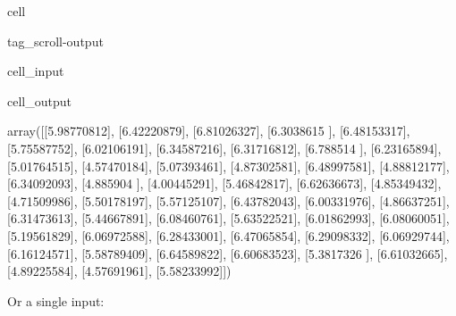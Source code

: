 \documentclass[letterpaper,10pt,english]{jupyterBook}
\begin{document}
\begin{sphinxuseclass}{cell}
\begin{sphinxuseclass}{tag_scroll-output}\begin{sphinxVerbatimInput}

\begin{sphinxuseclass}{cell_input}
\begin{sphinxVerbatim}[commandchars=\\\{\}]
  
\end{sphinxVerbatim}

\end{sphinxuseclass}\end{sphinxVerbatimInput}
\begin{sphinxVerbatimOutput}

\begin{sphinxuseclass}{cell_output}
\begin{sphinxVerbatim}[commandchars=\\\{\}]
array([[5.98770812],
       [6.42220879],
       [6.81026327],
       [6.3038615 ],
       [6.48153317],
       [5.75587752],
       [6.02106191],
       [6.34587216],
       [6.31716812],
       [6.788514  ],
       [6.23165894],
       [5.01764515],
       [4.57470184],
       [5.07393461],
       [4.87302581],
       [6.48997581],
       [4.88812177],
       [6.34092093],
       [4.885904  ],
       [4.00445291],
       [5.46842817],
       [6.62636673],
       [4.85349432],
       [4.71509986],
       [5.50178197],
       [5.57125107],
       [6.43782043],
       [6.00331976],
       [4.86637251],
       [6.31473613],
       [5.44667891],
       [6.08460761],
       [5.63522521],
       [6.01862993],
       [6.08060051],
       [5.19561829],
       [6.06972588],
       [6.28433001],
       [6.47065854],
       [6.29098332],
       [6.06929744],
       [6.16124571],
       [5.58789409],
       [6.64589822],
       [6.60683523],
       [5.3817326 ],
       [6.61032665],
       [4.89225584],
       [4.57691961],
       [5.58233992]])
\end{sphinxVerbatim}

\end{sphinxuseclass}\end{sphinxVerbatimOutput}

\end{sphinxuseclass}
\end{sphinxuseclass}
\sphinxAtStartPar
Or a single input:
\end{document}
